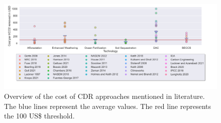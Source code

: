 \begin{figure}
\captionsetup{margin=3.5cm}
    \centering
    \includegraphics[width=550pt]{figures/cost.png}
    \caption{Overview of the cost of CDR approaches mentioned in literature. The blue lines represent the average values. The red line represents the 100 US\$ threshold.}
    \label{fig:awesome_image}
\end{figure}

\nocite{House2011EconomicAir, Aumont2006GlobalizingStudies, Buesseler2008OceanUncertainty, Cao2010ImportanceChange, Oschlies2010ClimateApprentice, Beringer2011BioenergyConstraints, Rogner2012EnergyPotentials, Krey2014GlobalReview, Cornelissen2012TheSystem}
\nocite{Cornelissen2012TheSystem, Mazzotti2013DirectContactor, Socolow2011DirectAffairs, Zeman2014ReducingCO2, Nemet2011WillingnessCapture, Kulkarni2012AnalysisAir, Stolaroff2008CarbonSpray}